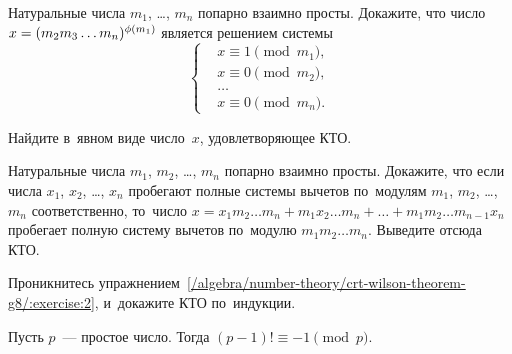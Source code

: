 \begin{problems}

\item
\subproblem
Натуральные числа $m_{1}$, \ldots, $m_{n}$ попарно взаимно просты.
Докажите, что число $x = (m_{2} m_{3} \ldots m_{n})^{\phi(m_{1})}$
является решением системы
\[ \left\{ \begin{aligned} &
    x \equiv 1 \pmod {m_1}
, \\ &
    x \equiv 0 \pmod {m_2}
, \\ & \ldots \\ &
    x \equiv 0 \pmod {m_n}
. \end{aligned} \right. \]
\par
\subproblem
Найдите в~явном виде число~$x$, удовлетворяющее КТО.

\item
Натуральные числа $m_{1}$, $m_{2}$, \ldots, $m_{n}$ попарно взаимно просты.
Докажите, что если числа $x_{1}$, $x_{2}$, \ldots, $x_{n}$ пробегают полные
системы вычетов по~модулям $m_{1}$, $m_{2}$, \ldots, $m_{n}$ соответственно,
то~число
\(
    x
=
    x_{1} m_{2} \ldots m_{n} + m_{1} x_{2} \ldots m_{n}
    + \ldots +
    m_{1} m_{2} \ldots m_{n-1} x_{n}
\) пробегает полную систему вычетов по~модулю $m_{1} m_{2} \ldots m_{n}$.
Выведите отсюда КТО.

\item
Проникнитесь
упражнением~\ref{/algebra/number-theory/crt-wilson-theorem-g8/:exercise:2},
и~докажите КТО по~индукции.

\end{problems}

Пусть $p$~--- простое число.
Тогда $(p - 1)! \equiv -1 \pmod p$.

